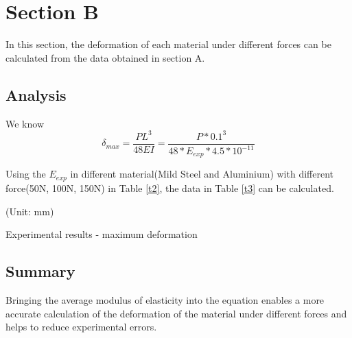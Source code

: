 \section*{Section B}
\label{sec:Section B}
\FloatBarrier %
In this section, the deformation of each material under different 
forces can be calculated from the data obtained in section A.

\subsection*{Analysis}

We know
\begin{equation} 
    \delta_{max}=\frac{PL^3}{48EI}=\frac{P*0.1^3}{48*E_{exp}*4.5*10^{-11}}
\end{equation}

Using the $E_{exp}$ in different material(Mild Steel and Aluminium)
 with different force(50N, 100N, 150N) in Table \ref{t2}, the data in Table \ref{t3} can be calculated.

\begin{minipage}[htbp]{\textwidth}
    \makeatletter{}
    \centering
    
    (Unit: mm)
    \caption{Experimental results - maximum deformation}
    \label{t3} 
\end{minipage}

\subsection*{Summary}

Bringing the average modulus of elasticity into the equation enables 
a more accurate calculation of the deformation of the material under 
different forces and helps to reduce experimental errors.
